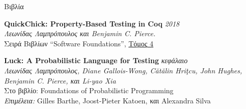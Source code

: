 \documentclass{resume} %
\begin{document}

\newcommand{\Catalin}{C\u{a}t\u{a}lin\xspace}
\newcommand{\Hritcu}{Hri\c{t}cu\xspace}
\newcommand{\Denes}{D\'en\`es\xspace}

\newcommand{\pub}[4]{
  {\bf #1} \hfill {\href{https://lemonidas.github.io/pdf/#2}{\bf \em #4}}\\
  {#3}
  }

\newcommand{\pubtwo}[6]{
  {\bf #1} \hfill {\href{https://lemonidas.github.io/pdf/#2}{\bf \em #4}}, {\href{https://lemonidas.github.io/pdf/#5}{\bf \em #6}}\\
  {#3}
  }

\newcommand{\pubsub}[5]{
  {\bf #1:} \hfill {\href{https://lemonidas.github.io/pdf/#2}{\bf \em #4}}\\
  {\bf #5}\\
  {#3}
  }

\begin{rSection}{\textgreek{Βιβλία}}

  {\bf QuickChick: Property-Based Testing in Coq} \hfill {\em 2018}\\
  {\em \textgreek{Λεωνίδας Λαμπρόπουλος και} Benjamin C. Pierce.}\\
  {\textgreek{Σειρά Βιβλίων} ``Software Foundations'', \href{https://softwarefoundations.cis.upenn.edu}{\textgreek{Τόμος} 4}}

  {\bf Luck: A Probabilistic Language for Testing} \hfill {\em \textgreek{κεφάλαιο}}\\
  {\em \textgreek{Λεωνίδας Λαμπρόπουλος}, Diane Gallois-Wong, C\u{a}t\u{a}lin Hri\c{t}cu, John Hughes, Benjamin C. Pierce, \textgreek{και} Li-yao Xia}\\
  \textgreek{Στο βιβλίο}: {Foundations of Probabilistic Programming} \\
  {\em \textgreek{Επιμέλεια}:} {Gilles Barthe, Joost-Pieter Katoen, \textgreek{και} Alexandra Silva}\\

\clearpage
  
\end{rSection}
\end{document}
